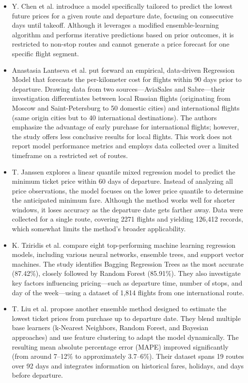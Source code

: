 \documentclass[conference]{IEEEtran}
\begin{document}
\begin{itemize}
    \item Y. Chen et al. \cite{b3} introduce a model specifically tailored to predict the lowest future prices for a given route and departure date, focusing on consecutive days until takeoff. Although it leverages a modified ensemble-learning algorithm and performs iterative predictions based on prior outcomes, it is restricted to non-stop routes and cannot generate a price forecast for one specific flight segment.
    \item Anastasia Lantseva et al. \cite{b4} put forward an empirical, data-driven Regression Model that forecasts the per-kilometer cost for flights within 90 days prior to departure. Drawing data from two sources—AviaSales and Sabre—their investigation differentiates between local Russian flights (originating from Moscow and Saint-Petersburg to 50 domestic cities) and international flights (same origin cities but to 40 international destinations). The authors emphasize the advantage of early purchase for international flights; however, the study offers less conclusive results for local flights. This work does not report model performance metrics and employs data collected over a limited timeframe on a restricted set of routes.
    \item T. Janssen \cite{b5} explores a linear quantile mixed regression model to predict the minimum ticket price within 60 days of departure. Instead of analyzing all price observations, the model focuses on the lower price quantile to determine the anticipated minimum fare. Although the method works well for shorter windows, it loses accuracy as the departure date gets farther away. Data were collected for a single route, covering 2271 flights and yielding 126,412 records, which somewhat limits the method’s broader applicability.
    \item K. Tziridis et al. \cite{b6} compare eight top-performing machine learning regression models, including various neural networks, ensemble trees, and support vector machines. The study identifies Bagging Regression Trees as the most accurate (87.42\%), closely followed by Random Forest (85.91\%). They also investigate key factors influencing pricing—such as departure time, number of stops, and day of the week—using a dataset of 1,814 flights from one international route.
    \item T. Liu et al. \cite{b7} propose another ensemble method designed to estimate the lowest ticket prices from purchase up to departure date. They blend multiple base learners (k-Nearest Neighbors, Random Forest, and Bayesian approaches) and use feature clustering to adapt the model dynamically. The resulting mean absolute percentage error (MAPE) improved significantly (from around 7–12\% to approximately 3.7–6\%). Their dataset spans 19 routes over 92 days and integrates information on historical fares, holidays, and days before departure.

\end{itemize}
\end{document}
